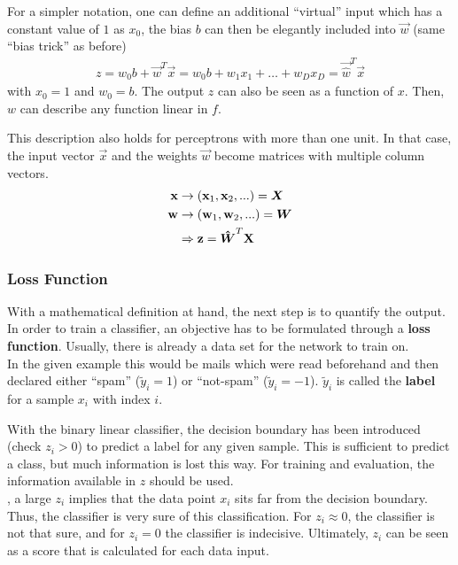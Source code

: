 For a simpler notation, one can define an additional ``virtual'' input which has a constant value of $1$ as $x_0$, the bias $b$ can then be elegantly included into $\vec{w}$ (same ``bias trick'' as before)
\begin{align}
    z = w_0 b + \vec{w}^T \vec{x} = w_0 b + w_1 x_1 + \hdots + w_D x_D = \vec{\hat{w}}^T \vec{x}
\end{align}
with $x_0 = 1$ and $w_0 = b$.
The output $z$ can also be seen as a function of $x$.
Then, $w$ can describe any function linear in $f$.

This description also holds for perceptrons with more than one unit.
In that case, the input vector $\vec{x}$ and the weights $\vec{w}$ become matrices with multiple column vectors.
\begin{align}
    \mathbf{x} & \rightarrow (\mathbf{x}_1, \mathbf{x}_2, ...) = \boldsymbol{X} \\
    \mathbf{w} & \rightarrow (\mathbf{w}_1, \mathbf{w}_2, ...) = \boldsymbol{W} \\
    & \Rightarrow \mathbf{z} = \boldsymbol{\hat{W}}^T \mathbf{X}
\end{align}


\subsubsection{Loss Function}
With a mathematical definition at hand, the next step is to quantify the output.
In order to train a classifier, an objective has to be formulated through a \textbf{loss function}.
Usually, there is already a data set for the network to train on.\\
In the given example this would be mails which were read beforehand and then declared either ``spam'' ($\tilde{y}_i = 1$) or ``not-spam'' ($\tilde{y}_i = -1$).
$\tilde{y}_i$ is called the \textbf{label} for a sample $x_i$ with index $i$.

With the binary linear classifier, the decision boundary has been introduced (check $z_i > 0$) to predict a label for any given sample.
This is sufficient to predict a class, but much information is lost this way.
For training and evaluation, the information available in $z$ should be used.\\
\eg, a large $z_i$ implies that the data point $x_i$ sits far from the decision boundary.
Thus, the classifier is very sure of this classification.
For $z_i \approx 0$, the classifier is not that sure, and for $z_i = 0$ the classifier is indecisive.
Ultimately, $z_i$ can be seen as a score that is calculated for each data input.

